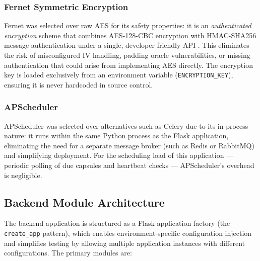 \documentclass[12pt, a4paper]{article}
\begin{document}
\subsubsection{Fernet Symmetric Encryption}

Fernet was selected over raw AES for its safety properties: it is an \textit{authenticated encryption} scheme that combines AES-128-CBC encryption with HMAC-SHA256 message authentication under a single, developer-friendly API \cite{pyca2024}. This eliminates the risk of misconfigured IV handling, padding oracle vulnerabilities, or missing authentication that could arise from implementing AES directly. The encryption key is loaded exclusively from an environment variable (\texttt{ENCRYPTION\_KEY}), ensuring it is never hardcoded in source control.

\subsubsection{APScheduler}

APScheduler \cite{apscheduler} was selected over alternatives such as Celery \cite{celery} due to its in-process nature: it runs within the same Python process as the Flask application, eliminating the need for a separate message broker (such as Redis or RabbitMQ) and simplifying deployment. For the scheduling load of this application — periodic polling of due capsules and heartbeat checks — APScheduler's overhead is negligible.

\subsection{Backend Module Architecture}

The backend application is structured as a Flask application factory (the \texttt{create\_app} pattern), which enables environment-specific configuration injection and simplifies testing by allowing multiple application instances with different configurations. The primary modules are:
\end{document}
